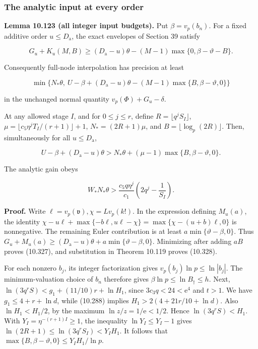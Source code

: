 \documentclass[
  11pt,
  a4paper,
]{article}
\begin{document}
\subsubsection{The analytic input at every
order}\label{the-analytic-input-at-every-order}

\textbf{Lemma 10.123 (all integer input budgets).} Put
\(\beta=v_p(b_n)\). For a fixed additive order \(u\le D_{\mathrm a}\),
the exact envelopes of Section 39 satisfy

\[
G_u+K_u(M,B)
\ge(D_{\mathrm a}-u)\theta
 -(M-1)\max\{0,\beta-\vartheta-B\}.
\tag{10.327}
\]

Consequently full-node interpolation has precision at least

\[
\min\{N_*\theta,\ U-\beta+(D_{\mathrm a}-u)\theta
 -(M-1)\max\{B,\beta-\vartheta,0\}\}
\tag{10.328}
\]

in the unchanged normal quantity \(v_p(\Phi)+G_u-\delta\).

At any allowed stage \(I\), and for \(0\le j\le r\), define
\(R=\lfloor q^jS_I\rfloor\),
\(\mu=\lfloor c_5\eta^jT_I/(r+1)\rfloor+1\), \(N_*=(2R+1)\mu\), and
\(B=\lfloor\log_p(2R)\rfloor\). Then, simultaneously for all
\(u\le D_{\mathrm a}\),

\[
U-\beta+(D_{\mathrm a}-u)\theta
>N_*\theta+(\mu-1)\max\{B,\beta-\vartheta,0\}.
\tag{10.329}
\]

The analytic gain obeys

\[
W_*N_*\theta>
\frac{c_5q\eta^j}{c_1}\left(2q^j-\frac1{S_I}\right).
\tag{10.330}
\]

\textbf{Proof.} Write \(\ell=v_p(\mathfrak v),\chi=Lv_p(k!)\). In the
expression defining \(M_u(a)\), the identity
\(\chi-u\ell+\max\{-b\ell,u\ell-\chi\}=\max\{\chi-(u+b)\ell,0\}\) is
nonnegative. The remaining Euler contribution is at least
\(a\min\{\vartheta-\beta,0\}\). Thus
\(G_u+M_u(a)\ge(D_{\mathrm a}-u)\theta+a\min\{\vartheta-\beta,0\}\).
Minimizing after adding \(aB\) proves (10.327), and substitution in
Theorem 10.119 proves (10.328).

For each nonzero \(b_j\), its integer factorization gives
\(v_p(b_j)\ln p\le\ln|b_j|\). The minimum-valuation choice of \(b_n\)
therefore gives \(\beta\ln p\le\ln B_\dagger\le h\). Next,
\(\ln(3q^rS)<g_1+(11/10)r+\ln H_1\), since \(3c_3q<24<\mathrm e^4\) and
\(t>1\). We have \(g_1\le4+r+\ln d\), while (10.288) implies
\(H_1>2(4+21r/10+\ln d)\). Also \(\ln H_1<H_1/2\), by the maximum
\(\ln z/z=1/\mathrm e<1/2\). Hence \(\ln(3q^rS)<H_1\). With
\(Y_I=\eta^{-(r+1)I}\ge1\), the inequality \(\ln Y_I\le Y_I-1\) gives
\(\ln(2R+1)\le\ln(3q^rS_I)<Y_IH_1\). It follows that
\(\max\{B,\beta-\vartheta,0\}\le Y_IH_1/\ln p\).
\end{document}
